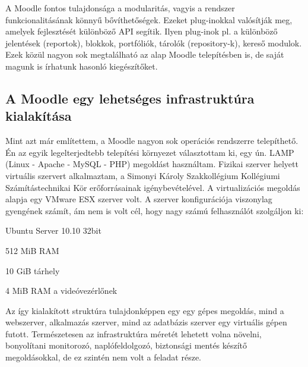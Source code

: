 A Moodle fontos tulajdonsága a modularitás, vagyis a rendszer funkcionalitásának könnyű bővíthetőségek. Ezeket plug-inokkal valósítják meg, amelyek fejlesztését különböző API segítik. Ilyen plug-inok pl. a különböző jelentések (reportok), blokkok, portfóliók, tárolók (repository-k), kereső modulok. Ezek közül nagyon sok megtalálható az alap Moodle telepítésben is, de saját magunk is írhatunk hasonló kiegészítőket.

\subsection{A Moodle egy lehetséges infrastruktúra kialakítása}

Mint azt már említettem, a Moodle nagyon sok operációs rendszerre telepíthető. Én az egyik legelterjedtebb telepítési környezet választottam ki, egy ún. LAMP (Linux - Apache - MySQL - PHP) megoldást használtam. Fizikai szerver helyett virtuális szervert alkalmaztam, a Simonyi Károly Szakkollégium Kollégiumi Számítástechnikai Kör erőforrásainak igénybevételével. A virtualizációs megoldás alapja egy VMware ESX szerver volt.
A szerver konfigurációja viszonylag gyengének számít, ám nem is volt cél, hogy nagy számú felhasználót szolgáljon ki:
\begin{sajat_itemize}
\item Ubuntu Server 10.10 32bit
\item 512 MiB RAM
\item 10 GiB tárhely
\item 4 MiB RAM a videóvezérlőnek 
\end{sajat_itemize}
Az így kialakított struktúra tulajdonképpen egy egy gépes megoldás, mind a webszerver, alkalmazás szerver, mind az adatbázis szerver egy virtuális gépen futott. Természetesen az infrastruktúra méretét lehetett volna növelni, bonyolítani monitorozó, naplófeldolgozó, biztonsági mentés készítő megoldásokkal, de ez szintén nem volt a feladat része.

